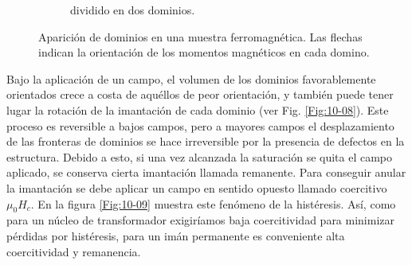 \begin{figure}[h!]
\begin{subfigure}{0.45\linewidth}
		\caption{dividido en dos dominios.}
		\label{Fig:10-07b}
	\end{subfigure}
	\caption{Aparición de dominios en una muestra ferromagnética. Las flechas indican la orientación de los momentos magnéticos en cada domino.}
	\label{Fig:10-07}
\end{figure}

Bajo la aplicación de un campo, el volumen de los dominios favorablemente orientados crece a costa de aquéllos de peor orientación, y también puede tener lugar la rotación de la imantación de cada dominio (ver Fig. \ref{Fig:10-08}). Este proceso es reversible a bajos campos, pero a mayores campos el desplazamiento de las fronteras de dominios se hace irreversible por la presencia de defectos en la estructura. Debido a esto, si una vez alcanzada la saturación se quita el campo aplicado, se conserva cierta imantación llamada remanente. Para conseguir anular la imantación se debe aplicar un campo en sentido opuesto llamado coercitivo $\mu_0 H_c$. En la figura \ref{Fig:10-09} muestra este fenómeno de la histéresis. Así, como para un núcleo de transformador exigiríamos baja coercitividad para minimizar pérdidas por histéresis, para un imán permanente es conveniente alta coercitividad y remanencia.



